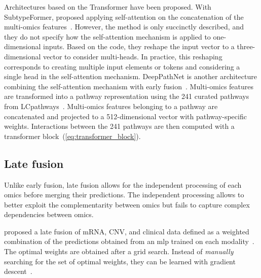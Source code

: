 \documentclass[../main.tex]{subfiles}
\begin{document}
	    Architectures based on the Transformer have been proposed.
	    With SubtypeFormer, \citeauthor{SubtypeFormer} proposed applying self-attention on the concatenation of the multi-omics features~\cite{SubtypeFormer}.
	    However, the method is only succinctly described, and they do not specify how the self-attention mechanism is applied to one-dimensional inputs.
	    Based on the code, they reshape the input vector to a three-dimensional vector to consider multi-heads.
	    In practice, this reshaping corresponds to creating multiple input elements or tokens and considering a single head in the self-attention mechanism.
	    DeepPathNet is another architecture combining the self-attention mechanism with early fusion~\cite{DeepPathNet}.
	    Multi-omics features are transformed into a pathway representation using the 241 curated pathways from LCpathways~\cite{LCpathways}.
	    Multi-omics features belonging to a pathway are concatenated and projected to a 512-dimensional vector with pathway-specific weights.
	    Interactions between the 241 pathways are then computed with a transformer block~(\cref{eq:transformer_block}).

	\subsection{Late fusion}
	    Unlike early fusion, late fusion allows for the independent processing of each omics before merging their predictions.
	    The independent processing allows to better exploit the complementarity between omics but fails to capture complex dependencies between omics.

	    \citeauthor{Sun2019} proposed a late fusion of mRNA, CNV, and clinical data defined as a weighted combination of the predictions obtained from an \gls{mlp} trained on each modality~\cite{Sun2019}.
	    The optimal weights are obtained after a grid search.
	    Instead of \emph{manually} searching for the set of optimal weights, they can be learned with gradient descent~\cite{CarrilloPerez2022}.
\end{document}
